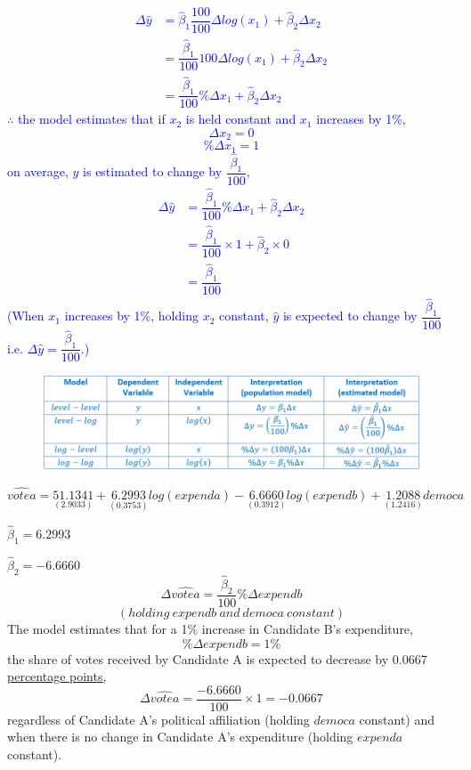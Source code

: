 \documentclass[12pt]{report}
\newenvironment{blueframed}[1][blue]
{\def\FrameCommand{\fboxsep=\FrameSep\fcolorbox{#1}{white}}%
	\MakeFramed {\advance\hsize-\width \FrameRestore}}
{\endMakeFramed}
\begin{document}
\justify
\begin{blueframed}
	\vspace{-\baselineskip}
	\justify
	\noindent \textcolor{blue}
	{
		\begin{align*}
		\Delta \hat{y} &= \hat{\beta}_1\dfrac{100}{100}\Delta log(x_1) + \hat{\beta}_2\Delta x_2 \\
		&= \dfrac{\hat{\beta}_1}{100} 100\Delta log(x_1) + \hat{\beta}_2\Delta x_2 \\
		&= \dfrac{\hat{\beta}_1}{100} \%\Delta x_1 + \hat{\beta}_2\Delta x_2
		\end{align*}
		$\therefore$ the model estimates that if $x_2$ is held constant and $x_1$ increases by 1\%, $$\Delta x_2 = 0$$ $$\% \Delta x_1 = 1$$ on average, $y$ is estimated to change by $\dfrac{\hat{\beta}_1}{100}$, \begin{align*}
		\Delta \hat{y} &= \dfrac{\hat{\beta}_1}{100} \%\Delta x_1 + \hat{\beta}_2\Delta x_2 \\
		&= \dfrac{\hat{\beta}_1}{100} \times 1 + \hat{\beta}_2 \times 0 \\
		&= \dfrac{\hat{\beta}_1}{100}
		\end{align*} (When $x_1$ increases by 1\%, holding $x_2$ constant, $\hat{y}$ is expected to change by $\dfrac{\hat{\beta}_1}{100}$ i.e. $\Delta\hat{y} = \dfrac{\hat{\beta}_1}{100}$.)
	}
\end{blueframed}
\begin{figure}[H]
	\centerline{\includegraphics{tute7_q1_1}}
\end{figure}
\vspace{-\baselineskip}

\newpage
$$\widehat{votea} = \underset{(2.9033)}{51.1341} + \underset{(0.3753)}{6.2993}log(expenda) - \underset{(0.3912)}{6.6660}log(expendb) + \underset{(1.2416)}{1.2088}democa$$

\noindent $\hat{\beta}_1 = 6.2993$



\vspace{10mm}
\noindent $\hat{\beta}_2 = -6.6660$
$${\Delta}\widehat{votea} = \dfrac{\hat{\beta}_2}{100}\%{\Delta}expendb$$
$$(holding\ expendb\ and\ democa\ constant)$$
The model estimates that for a 1\% increase in Candidate B’s expenditure,
$$\%{\Delta}expendb = 1\%$$
the share of votes received by Candidate A is expected to decrease by 0.0667 \uline{percentage points},
$${\Delta}\widehat{votea} = \dfrac{-6.6660}{100}\times1=-0.0667$$
regardless of Candidate A’s political affiliation (holding $democa$ constant) and when there is no change in Candidate A’s expenditure (holding $expenda$ constant).
\end{document}
